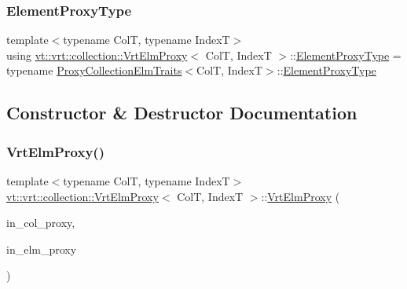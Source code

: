 \subsubsection{\texorpdfstring{Element\+Proxy\+Type}{ElementProxyType}}
{\footnotesize\ttfamily template$<$typename ColT, typename IndexT$>$ \\
using \hyperlink{structvt_1_1vrt_1_1collection_1_1_vrt_elm_proxy}{vt\+::vrt\+::collection\+::\+Vrt\+Elm\+Proxy}$<$ ColT, IndexT $>$\+::\hyperlink{structvt_1_1vrt_1_1collection_1_1_vrt_elm_proxy_aacc04b2ee9b318fba6f8641fec4b1316}{Element\+Proxy\+Type} =  typename \hyperlink{structvt_1_1vrt_1_1collection_1_1_proxy_collection_elm_traits}{Proxy\+Collection\+Elm\+Traits}$<$ColT, IndexT$>$\+::\hyperlink{structvt_1_1vrt_1_1collection_1_1_vrt_elm_proxy_aacc04b2ee9b318fba6f8641fec4b1316}{Element\+Proxy\+Type}}



\subsection{Constructor \& Destructor Documentation}
\mbox{\label{structvt_1_1vrt_1_1collection_1_1_vrt_elm_proxy_abf99f4ab16dd0daf6e732171032e9a71}} 
\subsubsection{\texorpdfstring{Vrt\+Elm\+Proxy()}{VrtElmProxy()}\hspace{0.1cm}{\footnotesize\ttfamily [1/5]}}
{\footnotesize\ttfamily template$<$typename ColT, typename IndexT$>$ \\
\hyperlink{structvt_1_1vrt_1_1collection_1_1_vrt_elm_proxy}{vt\+::vrt\+::collection\+::\+Vrt\+Elm\+Proxy}$<$ ColT, IndexT $>$\+::\hyperlink{structvt_1_1vrt_1_1collection_1_1_vrt_elm_proxy}{Vrt\+Elm\+Proxy} (\begin{DoxyParamCaption}\item[{\hyperlink{namespacevt_a1b417dd5d684f045bb58a0ede70045ac}{Virtual\+Proxy\+Type} const \&}]{in\+\_\+col\+\_\+proxy,  }\item[{\hyperlink{structvt_1_1vrt_1_1collection_1_1_base_elm_proxy}{Base\+Elm\+Proxy}$<$ ColT, IndexT $>$ const \&}]{in\+\_\+elm\+\_\+proxy }\end{DoxyParamCaption})\hspace{0.3cm}{\ttfamily [inline]}}

